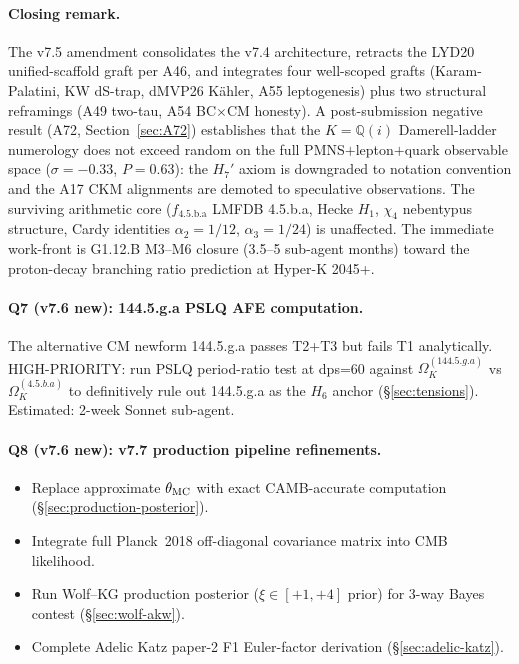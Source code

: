 \documentclass[a4paper,11pt]{article}
\newcommand{\fLM}{f_{\text{4.5.b.a}}}
\newcommand{\Qi}{\mathbb{Q}(i)}
\theoremstyle{definition}
\theoremstyle{remark}
\begin{document}
\paragraph{Closing remark.}  The v7.5 amendment consolidates
the v7.4 architecture, retracts the LYD20 unified-scaffold
graft per A46, and integrates four well-scoped grafts
(Karam-Palatini, KW dS-trap, dMVP26 K\"ahler, A55
leptogenesis) plus two structural reframings (A49 two-tau,
A54 BC$\times$CM honesty).  A post-submission negative result
(A72, Section~\ref{sec:A72}) establishes that the
$K=\Qi$ Damerell-ladder numerology does not exceed random
on the full PMNS$+$lepton$+$quark observable space
($\sigma=-0.33$, $P=0.63$): the $H_7'$ axiom is downgraded
to notation convention and the A17 CKM alignments are demoted
to speculative observations.  The surviving arithmetic core
($\fLM$ LMFDB 4.5.b.a, Hecke $H_1$, $\chi_4$ nebentypus
structure, Cardy identities $\alpha_2=1/12$, $\alpha_3=1/24$)
is unaffected.  The immediate work-front is G1.12.B M3--M6
closure (3.5--5 sub-agent months) toward the
proton-decay branching ratio prediction at Hyper-K 2045+.

\paragraph{Q7 (v7.6 new): 144.5.g.a PSLQ AFE computation.}
The alternative CM newform 144.5.g.a passes T2+T3 but fails T1
analytically.  HIGH-PRIORITY: run PSLQ period-ratio test at
dps=60 against $\Omega_K^{(144.5.g.a)}$ vs $\Omega_K^{(4.5.b.a)}$
to definitively rule out 144.5.g.a as the $H_6$ anchor
(\S\ref{sec:tensions}).  Estimated: 2-week Sonnet sub-agent.

\paragraph{Q8 (v7.6 new): v7.7 production pipeline refinements.}
\begin{itemize}
  \item Replace approximate $\theta_{\rm MC}$ with exact CAMB-accurate
    computation (\S\ref{sec:production-posterior}).
  \item Integrate full Planck~2018 off-diagonal covariance matrix
    into CMB likelihood.
  \item Run Wolf--KG production posterior ($\xi\in[+1,+4]$ prior)
    for 3-way Bayes contest (\S\ref{sec:wolf-akw}).
  \item Complete Adelic Katz paper-2 F1 Euler-factor derivation
    (\S\ref{sec:adelic-katz}).
\end{itemize}
\end{document}
